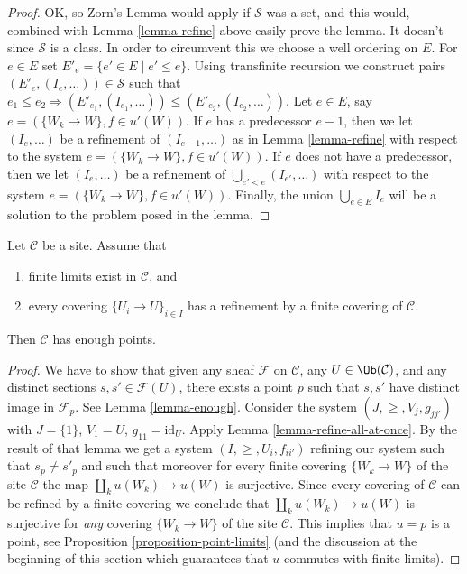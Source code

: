 \begin{proof}
\medskip\noindent
OK, so Zorn's Lemma would apply if $\mathcal{S}$ was a set,
and this would, combined with Lemma \ref{lemma-refine} above easily prove
the lemma. It doesn't since $\mathcal{S}$ is a class. In order
to circumvent this we choose a well ordering on $E$.
For $e \in E$ set $E'_e = \{e' \in E \mid e' \leq e\}$.
Using transfinite recursion we construct pairs
$(E'_e, (I_e, \ldots)) \in \mathcal{S}$ such that
$e_1 \leq e_2 \Rightarrow (E'_{e_1}, (I_{e_1}, \ldots))
\leq (E'_{e_2}, (I_{e_2}, \ldots))$.
Let $e \in E$, say $e = (\{W_k \to W\}, f\in u'(W))$.
If $e$ has a predecessor $e - 1$, then we let
$(I_e, \ldots)$ be a refinement of $(I_{e - 1}, \ldots)$
as in Lemma \ref{lemma-refine} with respect to the system
$e = (\{W_k \to W\}, f\in u'(W))$.
If $e$ does not have a predecessor, then we let
$(I_e, \ldots)$ be a refinement of $\bigcup_{e' < e} (I_{e'}, \ldots)$
with respect to the system
$e = (\{W_k \to W\}, f\in u'(W))$.
Finally, the union $\bigcup_{e \in E} I_e$ will be a solution to
the problem posed in the lemma.
\end{proof}

\begin{proposition}
\label{proposition-criterion-points}
\begin{reference}
\cite[Expos\'e VI, Appendix by Deligne, Proposition 9.0]{SGA4}
\end{reference}
Let $\mathcal{C}$ be a site. Assume that
\begin{enumerate}
\item finite limits exist in $\mathcal{C}$, and
\item every covering $\{U_i \to U\}_{i \in I}$
has a refinement by a finite covering of $\mathcal{C}$.
\end{enumerate}
Then $\mathcal{C}$ has enough points.
\end{proposition}

\begin{proof}
We have to show that given any sheaf
$\mathcal{F}$ on $\mathcal{C}$, any $U \in \Ob(\mathcal{C})$,
and any distinct sections $s, s' \in \mathcal{F}(U)$, there exists
a point $p$ such that $s, s'$ have distinct image in
$\mathcal{F}_p$. See Lemma \ref{lemma-enough}.
Consider the system $(J, \geq, V_j, g_{jj'})$
with $J = \{1\}$, $V_1 = U$, $g_{11} = \text{id}_U$.
Apply Lemma \ref{lemma-refine-all-at-once}.
By the result of that lemma we get a system
$(I, \geq, U_i, f_{ii'})$ refining our system such
that $s_p \not = s'_p$ and such that moreover for every
finite covering $\{W_k \to W\}$ of the site $\mathcal{C}$ the map
$\coprod_k u(W_k) \to u(W)$ is surjective.
Since every covering of $\mathcal{C}$ can be refined by
a finite covering we conclude that
$\coprod_k u(W_k) \to u(W)$ is surjective for {\it any}
covering $\{W_k \to W\}$ of the site $\mathcal{C}$.
This implies that $u = p$ is a point, see
Proposition \ref{proposition-point-limits} (and the discussion
at the beginning of this section which guarantees that $u$
commutes with finite limits).
\end{proof}

